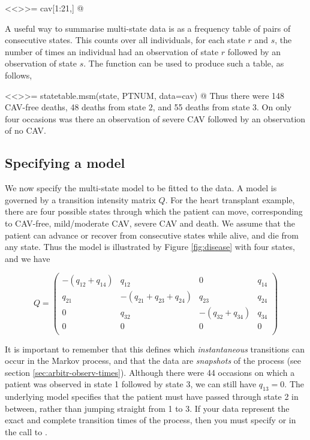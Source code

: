 <<>>=
cav[1:21,]
@

A useful way to summarise multi-state data is as a frequency table of
pairs of consecutive states.  This counts over all individuals, for
each state $r$ and $s$, the number of times an individual had an
observation of state $r$ followed by an observation of state $s$. The
function  can be used to produce such a table,
as follows,

<<>>=
statetable.msm(state, PTNUM, data=cav)
@
Thus there were 148 CAV-free deaths, 48 deaths from state 2, and
55 deaths from state 3.  On only four occasions was there an
observation of severe CAV followed by an observation of no CAV.   


\subsection{Specifying a model}
\label{sec:specifying:model}

We now specify the multi-state model to be fitted to the data.  A
model is governed by a transition intensity matrix $Q$. For the heart
transplant example, there are four possible states through which the
patient can move, corresponding to CAV-free, mild/moderate CAV, severe
CAV and death.  We assume that the patient can advance or recover from
consecutive states while alive, and die from any state. Thus the model
is illustrated by Figure \ref{fig:disease} with four states, and we
have

\[
Q = \left(
  \begin{array}{llll}
    -(q_{12} + q_{14}) & q_{12} &  0     & q_{14}\\
    q_{21} & -(q_{21}+q_{23}+q_{24}) & q_{23} & q_{24}\\
      0    & q_{32} & -(q_{32}+q_{34}) & q_{34}\\
      0    &   0    &   0    &   0   \\
  \end{array}
\right )
\]

It is important to remember that this defines which
\emph{instantaneous} transitions can occur in the Markov process, and
that the data are \emph{snapshots} of the process (see
section \ref{sec:arbitr-observ-times}).  Although there were 44
occasions on which a patient was observed in state 1 followed by state
3, we can still have $q_{13}=0$. The underlying model specifies that the patient must have passed
through state 2 in between, rather than jumping straight from 1 to 3.  If your data represent the exact and
complete transition times of the process, then you must specify
 or  in the call to
.

